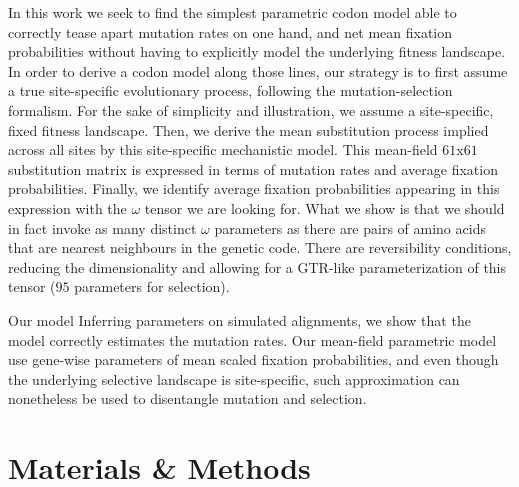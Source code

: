 In this work we seek to find the simplest parametric codon model able to correctly tease apart mutation rates on one hand, and net mean fixation probabilities without having to explicitly model the underlying fitness landscape.
In order to derive a codon model along those lines, our strategy is to first assume a true site-specific evolutionary process, following the mutation-selection formalism.
For the sake of simplicity and illustration, we assume a site-specific, fixed fitness landscape.
Then, we derive the mean substitution process implied across all sites by this site-specific mechanistic model.
This mean-field $61$x$61$ substitution matrix is expressed in terms of mutation rates and average fixation probabilities.
Finally, we identify average fixation probabilities appearing in this expression with the $\omega$ tensor we are looking for.
What we show is that we should in fact invoke as many distinct $\omega$ parameters as there are pairs of amino acids that are nearest neighbours in the genetic code.
There are reversibility conditions, reducing the dimensionality and allowing for a GTR-like parameterization of this tensor ($95$ parameters for selection).

Our model
Inferring parameters on simulated alignments, we show that the model correctly estimates the mutation rates.
Our mean-field parametric model use gene-wise parameters of mean scaled fixation probabilities, and even though the underlying selective landscape is site-specific, such approximation can nonetheless be used to disentangle mutation and selection.


\section{Materials \& Methods}

